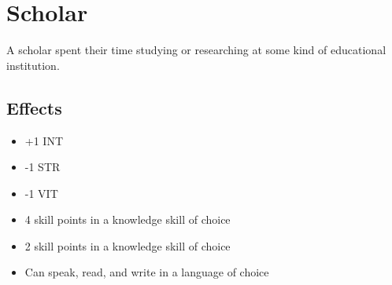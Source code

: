 \section{Scholar}\label{background:scholar}
A scholar spent their time studying or researching at some kind of educational
institution.

\subsection{Effects}
\begin{itemize}
    \item +1 INT
    \item -1 STR
    \item -1 VIT
    \item 4 skill points in a knowledge skill of choice
    \item 2 skill points in a knowledge skill of choice
    \item Can speak, read, and write in a language of choice
\end{itemize}
